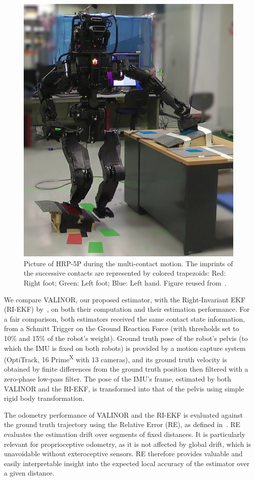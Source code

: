 \documentclass{IJCAS}
\begin{document}
\begin{figure}[!t]
\begin{center}
\includegraphics[width=0.6\columnwidth]{Uploaded/Images/multiContactExpe.png} 
\vskip -0.5pc
\caption{Picture of HRP-5P during the multi-contact motion. The imprints of the successive contacts are represented by colored trapezoids: Red: Right foot; Green: Left foot; Blue: Left hand. Figure reused from~\cite{Demont2024KineticsObserver}.}\label{fig:hrp5_multicontact}
\end{center}
\vskip -1.5pc
\end{figure}

\noindent We compare VALINOR, our proposed estimator, with the Right-Invariant EKF (RI-EKF) by~\cite{Hartley2020RIEKF}, on both their computation and their estimation performance. For a fair comparison, both estimators received the same contact state information, from a Schmitt Trigger on the Ground Reaction Force (with thresholds set to 10\% and 15\% of the robot's weight).
Ground truth pose of the robot's pelvis (to which the IMU is fixed on both robots) is provided by a motion capture system (OptiTrack, 16 Prime\textsuperscript{X} with 13 cameras), and its ground truth velocity is obtained by finite differences from the ground truth position then filtered with a zero-phase low-pass filter. The pose of the IMU's frame, estimated by both VALINOR and the RI-EKF, is transformed into that of the pelvis using simple rigid body transformation.

The odometry performance of VALINOR and the RI-EKF is evaluated against the ground truth trajectory using the Relative Error (RE), as defined in~\cite{Zhang2018QuantitativeTrajectoryEvaluation}. RE evaluates the estimation drift over segments of fixed distances. It is particularly relevant for proprioceptive odometry, as it is not affected by global drift, which is unavoidable without exteroceptive sensors. RE therefore provides valuable and easily interpretable insight into the expected local accuracy of the estimator over a given distance.
\end{document}
